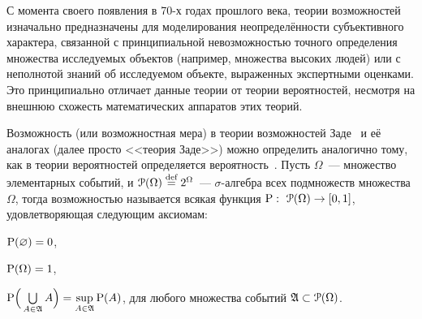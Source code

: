 
С момента своего появления в 70-х годах прошлого века, теории возможностей изначально предназначены для моделирования неопределённости субъективного характера, связанной с принципиальной невозможностью точного определения множества исследуемых объектов (например, множества высоких людей) или с неполнотой знаний об исследуемом объекте, выраженных экспертными оценками. Это принципиально отличает данные теории от теории вероятностей, несмотря на внешнюю схожесть математических аппаратов этих теорий. 

Возможность (или возможностная мера) в теории возможностей Заде~\cite{citeZadeh} и её аналогах (далее просто <<теория Заде>>) можно определить аналогично тому, как в теории вероятностей определяется вероятность~\cite{dubois_prade-1990}. Пусть $\Omega$~--- множество элементарных событий, и $\Po(\Omega)  \define= 2^\Omega$~--- $\sigma$-алгебра всех подмножеств множества $\Omega$, тогда 
\label{def_possibility}
возможностью называется всякая функция $\P:\ \Po(\Omega)\to[0,1]$, удовлетворяющая следующим аксиомам:
\begin{compactenum}
\item $\P(\varnothing) = 0$,\label{axiom_P1}
\item $\P(\Omega) = 1$,\label{axiom_P2}
\item $\P\Big(\bigcup\limits_{A\in\Alg} A\Big) = \sup\limits_{A\in\Alg}\P(A)$, для любого множества событий $\Alg\subset\Po(\Omega)$.\label{axiom_P3}
\end{compactenum}

